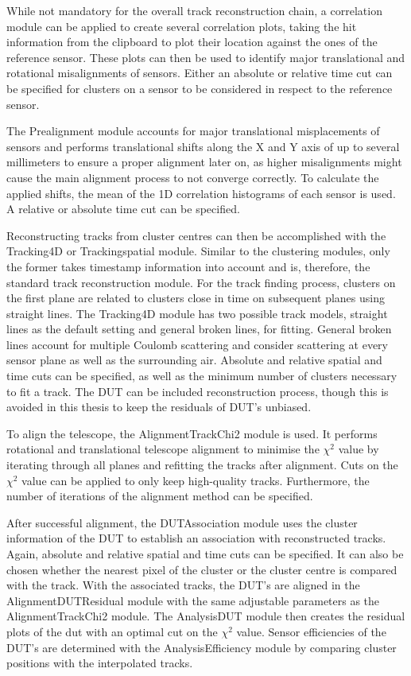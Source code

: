 While not mandatory for the overall track reconstruction chain, a correlation module can be applied to create several correlation plots, taking the hit information
from the clipboard to plot their location against the ones of the reference sensor. These plots can then be used to identify major translational and
rotational misalignments of sensors.  Either an absolute or relative time cut can be specified for clusters on a sensor to be considered in respect to
the reference sensor.

The Prealignment module accounts for major translational misplacements of sensors and performs translational shifts along the X and Y axis of up to several millimeters to ensure a proper alignment later on, as higher misalignments might cause the main alignment process to not converge correctly.
To calculate the applied shifts, the mean of the 1D correlation
histograms of each sensor is used. A relative or absolute time cut can be specified.

Reconstructing tracks from cluster centres can then be accomplished with the Tracking4D or Trackingspatial module. Similar to the clustering modules, only the former
takes timestamp information into account and is, therefore, the standard track reconstruction module. For the track finding process, clusters on the first plane are
related to clusters close in time on subsequent planes using straight lines.
The Tracking4D module has two possible track models, straight lines as the default setting and general
broken lines, for fitting. General broken lines account for multiple Coulomb scattering and consider scattering at every sensor plane as well as the surrounding air.
Absolute and relative spatial and time cuts can be specified, as well as the minimum number
of clusters necessary to fit a track. The DUT can be included reconstruction process, though this is avoided in this thesis to keep the residuals of DUT's unbiased.


To align the telescope, the AlignmentTrackChi2 module is used. It performs rotational and translational telescope
alignment to minimise the $\chi^2$ value by iterating through all planes and refitting the tracks after alignment. Cuts on the $\chi^2$ value can be
applied to only keep high-quality tracks. Furthermore, the number of iterations of the alignment method can be specified.

After successful alignment, the DUTAssociation module uses the cluster information of the DUT to establish an association with reconstructed tracks. Again, absolute
and relative spatial and time cuts can be specified. It can also be chosen whether the nearest pixel of the cluster or the cluster centre is compared with the track.
With the associated tracks, the DUT's are aligned in the AlignmentDUTResidual module with the same adjustable parameters as the AlignmentTrackChi2 module.
The AnalysisDUT module then creates the residual plots of the dut with an optimal cut on the $\chi^2$ value. Sensor efficiencies of the DUT's are determined with the
AnalysisEfficiency module by comparing cluster positions with the interpolated tracks.


